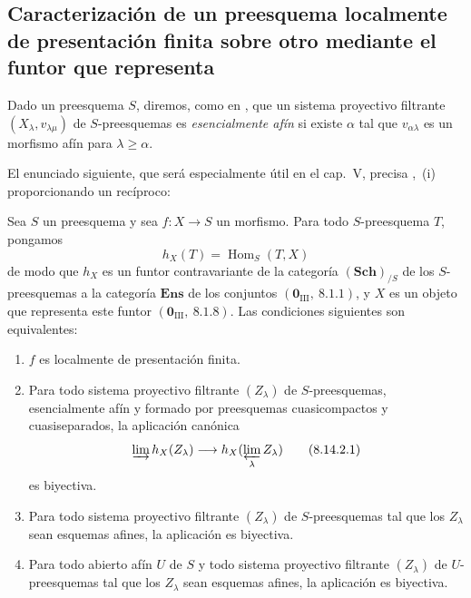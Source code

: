 \subsection{Caracterización de un preesquema localmente de presentación finita sobre otro mediante el funtor que representa}
\label{subsection:IV.8.14}

\begin{env}[8.14.1]
\label{IV.8.14.1}
Dado un preesquema $S$, diremos, como en , que un sistema proyectivo filtrante $(X_\lambda,v_{\lambda\mu})$ de $S$-preesquemas es \emph{esencialmente afín} si existe $\alpha$ tal que $v_{\alpha\lambda}$ es un morfismo afín para $\lambda\geqslant\alpha$.

El enunciado siguiente, que será especialmente útil en el cap.~V, precisa ,~(i) proporcionando un recíproco:
\end{env}

\begin{proposition}[8.14.2]
\label{IV.8.14.2}
Sea $S$ un preesquema y sea $f:X\to S$ un morfismo.
Para todo $S$-preesquema $T$, pongamos
\[
h_X(T)=\operatorname{Hom}_S(T,X)
\]
de modo que $h_X$ es un funtor contravariante de la categoría $(\mathbf{Sch})_{/S}$ de los $S$-preesquemas a la categoría $\mathbf{Ens}$ de los conjuntos $(\mathbf{0}_{\text{III}},~8.1.1)$, y $X$ es un objeto que representa este funtor $(\mathbf{0}_{\text{III}},~8.1.8)$.
Las condiciones siguientes son equivalentes:
\begin{enumerate}[label=\emph{\alph*)}]
  \item $f$ es localmente de presentación finita.
  \item Para todo sistema proyectivo filtrante $(Z_\lambda)$ de $S$-preesquemas, esencialmente afín  y formado por preesquemas cuasicompactos y cuasiseparados, la aplicación canónica 
\begin{equation}
\label{IV.8.14.2.1}
\varinjlim h_X(Z_\lambda)\to h_X(\varprojlim_\lambda Z_\lambda) \tag{8.14.2.1}
\end{equation}
es biyectiva.
  \item Para todo sistema proyectivo filtrante $(Z_\lambda)$ de $S$-preesquemas tal que los $Z_\lambda$ sean esquemas afines, la aplicación  es biyectiva.
  \item[\rm c$'$)] Para todo abierto afín $U$ de $S$ y todo sistema proyectivo filtrante $(Z_\lambda)$ de $U$-preesquemas tal que los $Z_\lambda$ sean esquemas afines, la aplicación  es biyectiva.
\end{enumerate}
\end{proposition}


